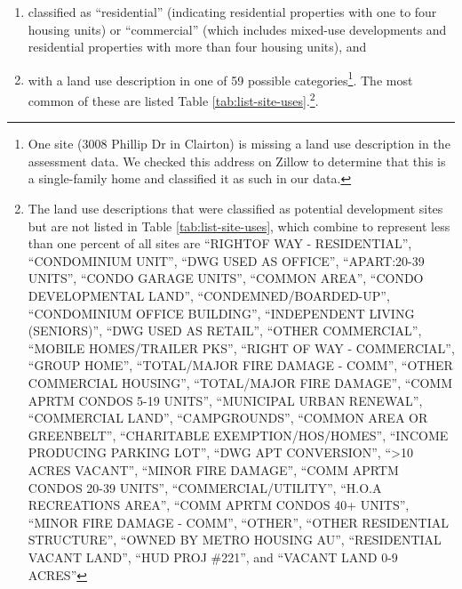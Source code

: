 \documentclass[
]{book}
\providecommand{\tightlist}{%
  \setlength{\itemsep}{0pt}\setlength{\parskip}{0pt}}
\begin{document}
\begin{enumerate}
\def\labelenumi{\arabic{enumi}.}
\tightlist
\item
  classified as ``residential''
  (indicating residential properties with one to four housing units) or ``commercial''
  (which includes mixed-use developments and residential properties with more than four
  housing units), and
\item
  with a land use description in one of 59 possible categories\footnote{One site (3008 Phillip Dr in Clairton) is missing a land use description in the assessment data. We checked this address on Zillow to determine that this is a single-family home and classified it as such in our data.}. The most common of
  these are listed Table \ref{tab:list-site-uses}.\footnote{The land use descriptions that were
    classified as potential development sites but are not listed in Table
    \ref{tab:list-site-uses}, which combine to represent less than one percent of all sites
    are ``RIGHTOF WAY - RESIDENTIAL'', ``CONDOMINIUM UNIT'', ``DWG USED AS OFFICE'',
    ``APART:20-39 UNITS'', ``CONDO GARAGE UNITS'', ``COMMON AREA'', ``CONDO DEVELOPMENTAL
    LAND'', ``CONDEMNED/BOARDED-UP'', ``CONDOMINIUM OFFICE BUILDING'', ``INDEPENDENT LIVING
    (SENIORS)'', ``DWG USED AS RETAIL'', ``OTHER COMMERCIAL'', ``MOBILE HOMES/TRAILER PKS'',
    ``RIGHT OF WAY - COMMERCIAL'', ``GROUP HOME'', ``TOTAL/MAJOR FIRE DAMAGE - COMM'',
    ``OTHER COMMERCIAL HOUSING'', ``TOTAL/MAJOR FIRE DAMAGE'', ``COMM APRTM CONDOS 5-19
    UNITS'', ``MUNICIPAL URBAN RENEWAL'', ``COMMERCIAL LAND'', ``CAMPGROUNDS'', ``COMMON AREA
    OR GREENBELT'', ``CHARITABLE EXEMPTION/HOS/HOMES'', ``INCOME PRODUCING PARKING LOT'',
    ``DWG APT CONVERSION'', ``\textgreater10 ACRES VACANT'', ``MINOR FIRE DAMAGE'', ``COMM APRTM CONDOS
    20-39 UNITS'', ``COMMERCIAL/UTILITY'',
    ``H.O.A RECREATIONS AREA'', ``COMM APRTM CONDOS 40+ UNITS'', ``MINOR FIRE DAMAGE - COMM'',
    ``OTHER'', ``OTHER RESIDENTIAL STRUCTURE'', ``OWNED BY METRO HOUSING AU'', ``RESIDENTIAL VACANT
    LAND'', ``HUD PROJ \#221'', and ``VACANT LAND 0-9 ACRES''}.
\end{enumerate}
\end{document}
